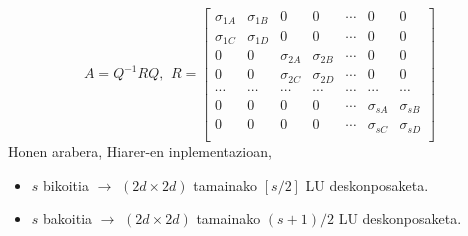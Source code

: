 \begin{equation*}
A=Q^{-1}RQ, \ \,
R=\begin{bmatrix}
\sigma_{1A} & \sigma_{1B}   &  0          &  0            & \cdots &  0           &    0       \\
\sigma_{1C} & \sigma_{1D}   & 0           &  0            & \cdots &  0           &    0       \\
 0          & 0             & \sigma_{2A} & \sigma_{2B}   & \cdots &  0           &    0       \\
 0          & 0             & \sigma_{2C} & \sigma_{2D}   & \cdots &  0           &    0       \\
 \cdots     & \cdots        &  \cdots     & \cdots        & \cdots & \cdots       &    \cdots   \\
 0          & 0             &  0          & 0             & \cdots & \sigma_{sA}  & \sigma_{sB} \\
 0          & 0             &  0          & 0             & \cdots & \sigma_{sC}  & \sigma_{sD} \\
\end{bmatrix}
\end{equation*}
Honen arabera, Hiarer-en inplementazioan,
\begin{itemize}
\item $s$ bikoitia $\rightarrow$ $(2d \times 2d)$ tamainako $[s/2]$  LU deskonposaketa.
\item $s$ bakoitia $\rightarrow$ $(2d \times 2d)$ tamainako $(s+1)/2$  LU deskonposaketa.
\end{itemize}


